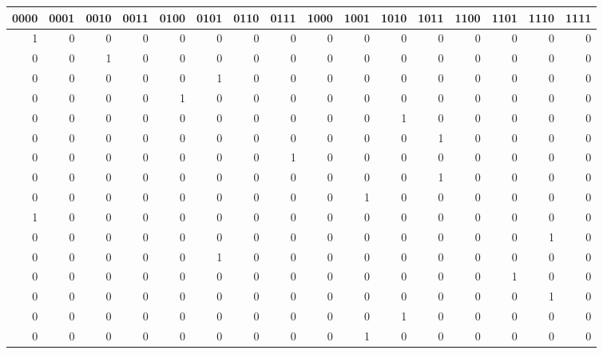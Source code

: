 \begin{tabular}{rrrrrrrrrrrrrrrr}
\hline
   0000 &   0001 &   0010 &   0011 &   0100 &   0101 &   0110 &   0111 &   1000 &   1001 &   1010 &   1011 &   1100 &   1101 &   1110 &   1111 \\
\hline
      1 &      0 &      0 &      0 &      0 &      0 &      0 &      0 &      0 &      0 &      0 &      0 &      0 &      0 &      0 &      0 \\
      0 &      0 &      1 &      0 &      0 &      0 &      0 &      0 &      0 &      0 &      0 &      0 &      0 &      0 &      0 &      0 \\
      0 &      0 &      0 &      0 &      0 &      1 &      0 &      0 &      0 &      0 &      0 &      0 &      0 &      0 &      0 &      0 \\
      0 &      0 &      0 &      0 &      1 &      0 &      0 &      0 &      0 &      0 &      0 &      0 &      0 &      0 &      0 &      0 \\
      0 &      0 &      0 &      0 &      0 &      0 &      0 &      0 &      0 &      0 &      1 &      0 &      0 &      0 &      0 &      0 \\
      0 &      0 &      0 &      0 &      0 &      0 &      0 &      0 &      0 &      0 &      0 &      1 &      0 &      0 &      0 &      0 \\
      0 &      0 &      0 &      0 &      0 &      0 &      0 &      1 &      0 &      0 &      0 &      0 &      0 &      0 &      0 &      0 \\
      0 &      0 &      0 &      0 &      0 &      0 &      0 &      0 &      0 &      0 &      0 &      1 &      0 &      0 &      0 &      0 \\
      0 &      0 &      0 &      0 &      0 &      0 &      0 &      0 &      0 &      1 &      0 &      0 &      0 &      0 &      0 &      0 \\
      1 &      0 &      0 &      0 &      0 &      0 &      0 &      0 &      0 &      0 &      0 &      0 &      0 &      0 &      0 &      0 \\
      0 &      0 &      0 &      0 &      0 &      0 &      0 &      0 &      0 &      0 &      0 &      0 &      0 &      0 &      1 &      0 \\
      0 &      0 &      0 &      0 &      0 &      1 &      0 &      0 &      0 &      0 &      0 &      0 &      0 &      0 &      0 &      0 \\
      0 &      0 &      0 &      0 &      0 &      0 &      0 &      0 &      0 &      0 &      0 &      0 &      0 &      1 &      0 &      0 \\
      0 &      0 &      0 &      0 &      0 &      0 &      0 &      0 &      0 &      0 &      0 &      0 &      0 &      0 &      1 &      0 \\
      0 &      0 &      0 &      0 &      0 &      0 &      0 &      0 &      0 &      0 &      1 &      0 &      0 &      0 &      0 &      0 \\
      0 &      0 &      0 &      0 &      0 &      0 &      0 &      0 &      0 &      1 &      0 &      0 &      0 &      0 &      0 &      0 \\
\hline
\end{tabular}
